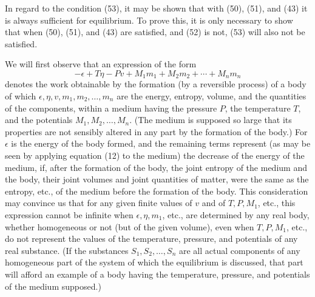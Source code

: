 \documentclass[11pt]{article}
\begin{document}
In regard to the condition (53), it may be shown that with (50), (51), and (43) it is always sufficient for equilibrium. To prove this, it is only necessary to show that when (50), (51), and (43) are satisfied, and (52) is not, (53) will also not be satisfied.

We will first observe that an expression of the form
\begin{equation}
-\epsilon+T\eta-Pv+M_1m_1+M_2m_2+\cdots+M_nm_n
\end{equation}
denotes the work obtainable by the formation (by a reversible process) of a body of which \(\epsilon,\eta,v,m_1,m_2,\ldots,m_n\) are the energy, entropy, volume, and the quantities of the components, within a medium having the pressure \(P\), the temperature \(T\), and the potentials \(M_1,M_2,\ldots,M_n\). (The medium is supposed so large that its properties are not sensibly altered in any part by the formation of the body.) For \(\epsilon\) is the energy of the body formed, and the remaining terms represent (as may be seen by applying equation (12) to the medium) the decrease of the energy of the medium, if, after the formation of the body, the joint entropy of the medium and the body, their joint volumes and joint quantities of matter, were the same as the entropy, etc., of the medium before the formation of the body. This consideration may convince us that for any given finite values of \(v\) and of \(T,P,M_1\), etc., this expression cannot be infinite when \(\epsilon,\eta,m_1\), etc., are determined by any real body, whether homogeneous or not (but of the given volume), even when \(T,P,M_1\), etc., do not represent the values of the temperature, pressure, and potentials of any real substance. (If the substances \(S_1,S_2,\ldots,S_n\) are all actual components of any homogeneous part of the system of which the equilibrium is discussed, that part will afford an example of a body having the temperature, pressure, and potentials of the medium supposed.)
\end{document}

